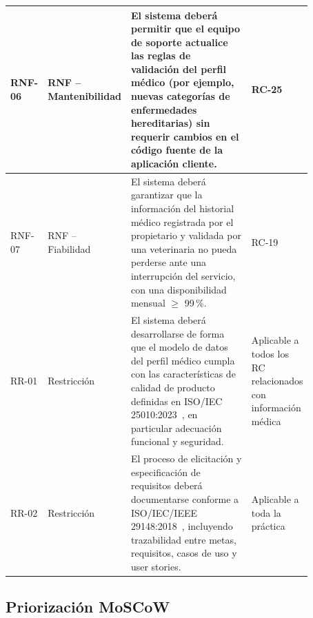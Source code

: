 \documentclass[journal,onecolumn]{IEEEtran}
\begin{document}
\begin{longtable}{| >{\centering\arraybackslash}p{0.12\linewidth} | >{\raggedright\arraybackslash}p{0.16\linewidth} | p{0.43\linewidth} | >{\raggedright\arraybackslash}p{0.16\linewidth} |}
	\hline
	RNF-06 & RNF -- Mantenibilidad & El sistema deberá permitir que el equipo de soporte actualice las reglas de validación del perfil médico (por ejemplo, nuevas categorías de enfermedades hereditarias) sin requerir cambios en el código fuente de la aplicación cliente. & RC-25 \\
	\hline
	RNF-07 & RNF -- Fiabilidad & El sistema deberá garantizar que la información del historial médico registrada por el propietario y validada por una veterinaria no pueda perderse ante una interrupción del servicio, con una disponibilidad mensual $\geq$ 99\,\%. & RC-19 \\
	\hline
	RR-01 & Restricción & El sistema deberá desarrollarse de forma que el modelo de datos del perfil médico cumpla con las características de calidad de producto definidas en ISO/IEC 25010:2023~\cite{iso25010}, en particular adecuación funcional y seguridad. & Aplicable a todos los RC relacionados con información médica \\
	\hline
	RR-02 & Restricción & El proceso de elicitación y especificación de requisitos deberá documentarse conforme a ISO/IEC/IEEE 29148:2018~\cite{iso29148}, incluyendo trazabilidad entre metas, requisitos, casos de uso y user stories. & Aplicable a toda la práctica \\
	\hline
\end{longtable}

\subsection{Priorización MoSCoW}
\end{document}
